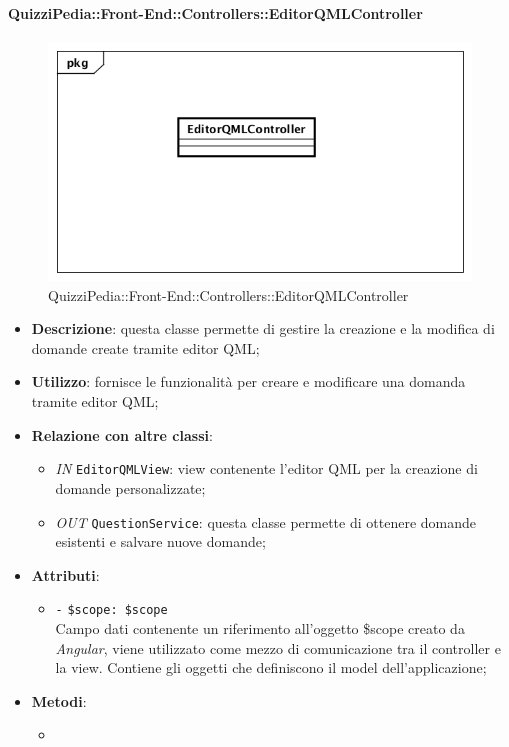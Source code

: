 \paragraph{QuizziPedia::Front-End::Controllers::EditorQMLController}
\begin{figure}
	\centering
	\includegraphics[scale=0.45]{UML/Classi/Front-End/QuizziPedia_Front-end_Controller_EditorQMLController.png}
	\caption{QuizziPedia::Front-End::Controllers::EditorQMLController}
\end{figure}
\begin{itemize}
	\item \textbf{Descrizione}: questa classe permette di gestire la creazione e la modifica di domande create tramite editor QML;
	\item \textbf{Utilizzo}: fornisce le funzionalità per creare e modificare una domanda tramite editor QML;
	\item \textbf{Relazione con altre classi}:
	\begin{itemize}
		\item \textit{IN} \texttt{EditorQMLView}: view contenente l'editor QML per la creazione di domande personalizzate; 
		\item \textit{OUT} \texttt{QuestionService}: questa classe permette di ottenere domande esistenti e salvare nuove domande;
	\end{itemize}
	\item \textbf{Attributi}:
	\begin{itemize}
		\item \texttt{-} \texttt{\$scope: \$scope} \\
		Campo dati contenente un riferimento all’oggetto \$scope creato da \textit{Angular}, viene utilizzato come mezzo di comunicazione tra il controller e la view. Contiene gli oggetti che definiscono il model dell’applicazione;
	\end{itemize}
	\item \textbf{Metodi}:
	\begin{itemize}
		\item 
	\end{itemize}
\end{itemize}

